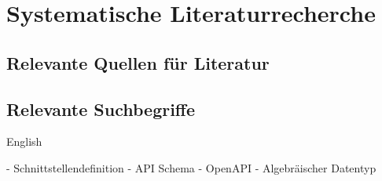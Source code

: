 \section{Systematische Literaturrecherche}



\subsection{Relevante Quellen für Literatur}

\subsection{Relevante Suchbegriffe}

English

- Schnittstellendefinition
- API Schema
- OpenAPI
- Algebräischer Datentyp
